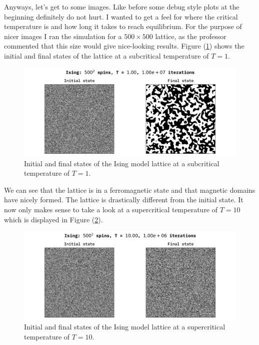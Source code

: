 \documentclass[10pt, titlepage, a4paper]{article}
\begin{document}


Anyways, let's get to some images. Like before some debug style plots at the beginning definitely do not hurt. I wanted to get a feel for where the 
critical temperature is and how long it takes to reach equilibrium. For the purpose of nicer images I ran the simulation for a $500\times 500$ lattice, 
as the professor commented that this size would give nice-looking results. Figure (\ref{fig:ising-demo-subcritical}) shows the initial and 
final states of the lattice at a subcritical temperature of $T=1$.

\begin{figure}[H]
    \centering
    \includegraphics[width=.95\textwidth]{../IsingModel/Images/ising-demo-subcritical.png}
    \caption{Initial and final states of the Ising model lattice at a subcritical temperature of $T=1$.}
    \label{fig:ising-demo-subcritical}
\end{figure}

We can see that the lattice is in a ferromagnetic state and that magnetic domains have nicely formed. The lattice is drastically different 
from the initial state. It now only makes sense to take a look at a supercritical temperature of $T=10$ which is displayed 
in Figure (\ref{fig:ising-demo-supercritical}).

\begin{figure}[H]
    \centering
    \includegraphics[width=.95\textwidth]{../IsingModel/Images/ising-demo-supercritical.png}
    \caption{Initial and final states of the Ising model lattice at a supercritical temperature of $T=10$.}
    \label{fig:ising-demo-supercritical}
\end{figure}
\end{document}
